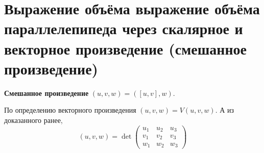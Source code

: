 \section{Выражение объёма выражение объёма параллелепипеда через скалярное и векторное произведение (смешанное произведение)}
\begin{definition}
    \textbf{Смешанное произведение} $(u, v, w) = ([u, v], w)$.
\end{definition}

\begin{remark}
    По определению векторного произведения $(u, v, w) = V(u, v, w)$. А из доказанного ранее, 
    $$
    (u, v, w) = \det\begin{pmatrix}
        u_1 & u_2 & u_3\\
        v_1 & v_2 & v_3\\
        w_1 & w_2 & w_3
    \end{pmatrix}
    $$
\end{remark}



